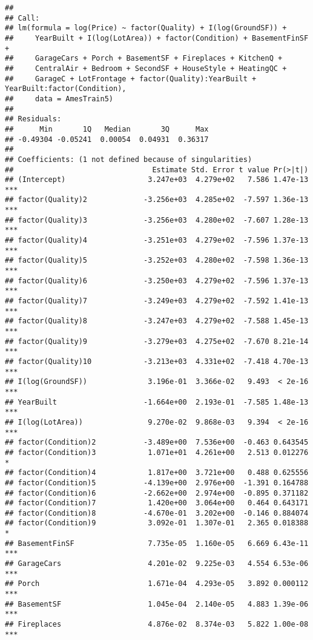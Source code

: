 \documentclass[
]{article}
\begin{document}
\begin{verbatim}
## 
## Call:
## lm(formula = log(Price) ~ factor(Quality) + I(log(GroundSF)) + 
##     YearBuilt + I(log(LotArea)) + factor(Condition) + BasementFinSF + 
##     GarageCars + Porch + BasementSF + Fireplaces + KitchenQ + 
##     CentralAir + Bedroom + SecondSF + HouseStyle + HeatingQC + 
##     GarageC + LotFrontage + factor(Quality):YearBuilt + YearBuilt:factor(Condition), 
##     data = AmesTrain5)
## 
## Residuals:
##      Min       1Q   Median       3Q      Max 
## -0.49304 -0.05241  0.00054  0.04931  0.36317 
## 
## Coefficients: (1 not defined because of singularities)
##                                Estimate Std. Error t value Pr(>|t|)    
## (Intercept)                   3.247e+03  4.279e+02   7.586 1.47e-13 ***
## factor(Quality)2             -3.256e+03  4.285e+02  -7.597 1.36e-13 ***
## factor(Quality)3             -3.256e+03  4.280e+02  -7.607 1.28e-13 ***
## factor(Quality)4             -3.251e+03  4.279e+02  -7.596 1.37e-13 ***
## factor(Quality)5             -3.252e+03  4.280e+02  -7.598 1.36e-13 ***
## factor(Quality)6             -3.250e+03  4.279e+02  -7.596 1.37e-13 ***
## factor(Quality)7             -3.249e+03  4.279e+02  -7.592 1.41e-13 ***
## factor(Quality)8             -3.247e+03  4.279e+02  -7.588 1.45e-13 ***
## factor(Quality)9             -3.279e+03  4.275e+02  -7.670 8.21e-14 ***
## factor(Quality)10            -3.213e+03  4.331e+02  -7.418 4.70e-13 ***
## I(log(GroundSF))              3.196e-01  3.366e-02   9.493  < 2e-16 ***
## YearBuilt                    -1.664e+00  2.193e-01  -7.585 1.48e-13 ***
## I(log(LotArea))               9.270e-02  9.868e-03   9.394  < 2e-16 ***
## factor(Condition)2           -3.489e+00  7.536e+00  -0.463 0.643545    
## factor(Condition)3            1.071e+01  4.261e+00   2.513 0.012276 *  
## factor(Condition)4            1.817e+00  3.721e+00   0.488 0.625556    
## factor(Condition)5           -4.139e+00  2.976e+00  -1.391 0.164788    
## factor(Condition)6           -2.662e+00  2.974e+00  -0.895 0.371182    
## factor(Condition)7            1.420e+00  3.064e+00   0.464 0.643171    
## factor(Condition)8           -4.670e-01  3.202e+00  -0.146 0.884074    
## factor(Condition)9            3.092e-01  1.307e-01   2.365 0.018388 *  
## BasementFinSF                 7.735e-05  1.160e-05   6.669 6.43e-11 ***
## GarageCars                    4.201e-02  9.225e-03   4.554 6.53e-06 ***
## Porch                         1.671e-04  4.293e-05   3.892 0.000112 ***
## BasementSF                    1.045e-04  2.140e-05   4.883 1.39e-06 ***
## Fireplaces                    4.876e-02  8.374e-03   5.822 1.00e-08 ***

\end{verbatim}
\end{document}
